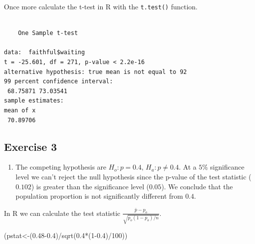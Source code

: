 \documentclass[
  letterpaper,
  DIV=11,
  numbers=noendperiod]{scrreprt}
\newenvironment{Shaded}{\begin{snugshade}}{\end{snugshade}}
\newcommand{\AttributeTok}[1]{\textcolor[rgb]{0.40,0.45,0.13}{#1}}
\newcommand{\DecValTok}[1]{\textcolor[rgb]{0.68,0.00,0.00}{#1}}
\newcommand{\FloatTok}[1]{\textcolor[rgb]{0.68,0.00,0.00}{#1}}
\newcommand{\FunctionTok}[1]{\textcolor[rgb]{0.28,0.35,0.67}{#1}}
\newcommand{\NormalTok}[1]{\textcolor[rgb]{0.00,0.23,0.31}{#1}}
\newcommand{\OtherTok}[1]{\textcolor[rgb]{0.00,0.23,0.31}{#1}}
\newcommand{\SpecialCharTok}[1]{\textcolor[rgb]{0.37,0.37,0.37}{#1}}
\newcommand{\StringTok}[1]{\textcolor[rgb]{0.13,0.47,0.30}{#1}}
\providecommand{\tightlist}{%
  \setlength{\itemsep}{0pt}\setlength{\parskip}{0pt}}\usepackage{longtable,booktabs,array}
\begin{document}
Once more calculate the t-test in R with the \texttt{t.test()} function.

\begin{Shaded}
\end{Shaded}

\begin{verbatim}

    One Sample t-test

data:  faithful$waiting
t = -25.601, df = 271, p-value < 2.2e-16
alternative hypothesis: true mean is not equal to 92
99 percent confidence interval:
 68.75871 73.03541
sample estimates:
mean of x 
 70.89706 
\end{verbatim}

\hypertarget{exercise-3-25}{%
\subsection*{Exercise 3}\label{exercise-3-25}}

\begin{enumerate}
\def\labelenumi{\arabic{enumi}.}
\tightlist
\item
  The competing hypothesis are \(H_{o}: p = 0.4\),
  \(H_{a}: p \neq 0.4\). At a \(5\)\% significance level we can't reject
  the null hypothesis since the p-value of the test statistic
  (\(0.102\)) is greater than the significance level (\(0.05\)). We
  conclude that the population proportion is not significantly different
  from \(0.4\).
\end{enumerate}

In R we can calculate the test statistic
\(\frac {\bar{p}-p_{o}}{\sqrt {p_{o}(1-p_{o})/n}}\).

\begin{Shaded}
\begin{Highlighting}[numbers=left,,]
\NormalTok{(pstat}\OtherTok{\textless{}{-}}\NormalTok{(}\FloatTok{0.48{-}0.4}\NormalTok{)}\SpecialCharTok{/}\FunctionTok{sqrt}\NormalTok{(}\FloatTok{0.4}\SpecialCharTok{*}\NormalTok{(}\DecValTok{1}\FloatTok{{-}0.4}\NormalTok{)}\SpecialCharTok{/}\DecValTok{100}\NormalTok{))}
\end{Highlighting}
\end{Shaded}
\end{document}
